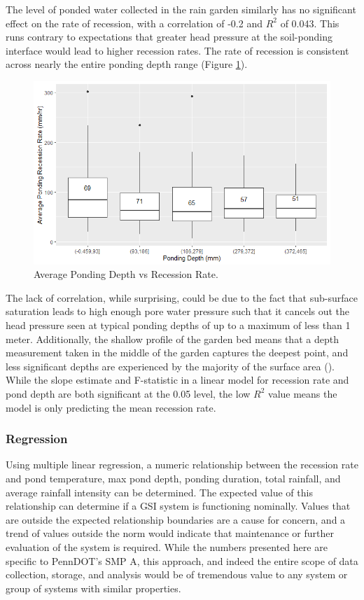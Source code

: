 The level of ponded water collected in the rain garden similarly has no significant effect on the rate of recession, with a correlation of -0.2 and $R^2$ of 0.043.
This runs contrary to expectations that greater head pressure at the soil-ponding interface would lead to higher recession rates.
The rate of recession is consistent across nearly the entire ponding depth range (Figure \ref{fig:recession-ponding-depth-bin}).
\begin{figure}[ht]
	\centering
	\includegraphics[width=\textwidth]{gfx/chapter-data-analysis/pond_depth_vs_recession_rate_by_storm.png}
	\caption{Average Ponding Depth vs Recession Rate.}
	\label{fig:recession-ponding-depth-bin}
\end{figure}
The lack of correlation, while surprising, could be due to the fact that sub-surface saturation leads to high enough pore water pressure such that it cancels out the head pressure seen at typical ponding depths of up to a maximum of less than 1 meter.
Additionally, the shallow profile of the garden bed means that a depth measurement taken in the middle of the garden captures the deepest point, and less significant depths are experienced by the majority of the surface area (\cite{Sokolovskaya2021}).
While the slope estimate and F-statistic in a linear model for recession rate and pond depth are both significant at the 0.05 level, the low $R^2$ value means the model is only predicting the mean recession rate.


\subsubsection{Regression}
Using multiple linear regression, a numeric relationship between the recession rate and pond temperature, max pond depth, ponding duration, total rainfall, and average rainfall intensity can be determined.
The expected value of this relationship can determine if a GSI system is functioning nominally.
Values that are outside the expected relationship boundaries are a cause for concern, and a trend of values outside the norm would indicate that maintenance or further evaluation of the system is required.
While the numbers presented here are specific to PennDOT's SMP A, this approach, and indeed the entire scope of data collection, storage, and analysis would be of tremendous value to any system or group of systems with similar properties.


